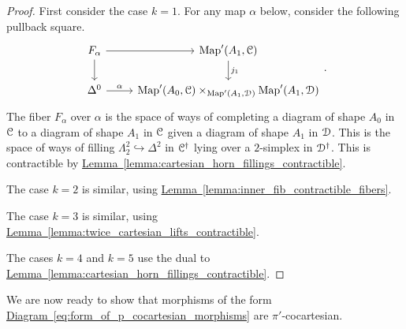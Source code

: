 \documentclass[main.tex]{subfiles}
\begin{document}
\begin{proof}
  First consider the case $k = 1$. For any map $\alpha$ below, consider the following pullback square.
  \begin{equation*}
    \begin{tikzcd}
      F_{\alpha}
      \arrow[r]
      \arrow[d]
      & \Fun'(A_{1}, \category{C})
      \arrow[d, "j_{1}"]
      \\
      \Delta^{0}
      \arrow[r, "\alpha"]
      & \Fun'(A_{0}, \category{C})
      \times_{\Fun'(A_{1}, \category{D})}
      \Fun'(A_{1}, \category{D})
    \end{tikzcd}.
  \end{equation*}
  The fiber $F_{\alpha}$ over $\alpha$ is the space of ways of completing a diagram of shape $A_{0}$ in $\mathcal{C}$ to a diagram of shape $A_{1}$ in $\mathcal{C}$ given a diagram of shape $A_{1}$ in $\mathcal{D}$. This is the space of ways of filling $\Lambda^{2}_{2} \hookrightarrow \Delta^{2}$ in $\mathcal{C}^{\dagger}$ lying over a $2$-simplex in $\mathcal{D}^{\dagger}$. This is contractible by \hyperref[lemma:cartesian_horn_fillings_contractible]{Lemma~\ref*{lemma:cartesian_horn_fillings_contractible}}.

  The case $k = 2$ is similar, using \hyperref[lemma:inner_fib_contractible_fibers]{Lemma~\ref*{lemma:inner_fib_contractible_fibers}}.

  The case $k = 3$ is similar, using \hyperref[lemma:twice_cartesian_lifts_contractible]{Lemma~\ref*{lemma:twice_cartesian_lifts_contractible}}.

  The cases $k = 4$ and $k = 5$ use the dual to \hyperref[lemma:cartesian_horn_fillings_contractible]{Lemma~\ref*{lemma:cartesian_horn_fillings_contractible}}.
\end{proof}
We are now ready to show that morphisms of the form \hyperref[eq:form_of_p_cocartesian_morphisms]{Diagram~\ref*{eq:form_of_p_cocartesian_morphisms}} are $\pi'$-cocartesian. 
\end{document}
